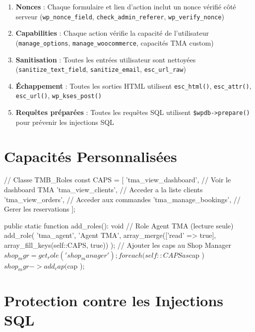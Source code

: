 \documentclass[12pt,a4paper]{report}
\begin{document}
\begin{enumerate}
  \item \textbf{Nonces} : Chaque formulaire et lien d'action inclut un nonce v\'erifi\'e
        c\^ot\'e serveur (\texttt{wp\_nonce\_field}, \texttt{check\_admin\_referer},
        \texttt{wp\_verify\_nonce})
  \item \textbf{Capabilities} : Chaque action v\'erifie la capacit\'e de l'utilisateur
        (\texttt{manage\_options}, \texttt{manage\_woocommerce}, capacit\'es TMA custom)
  \item \textbf{Sanitisation} : Toutes les entr\'ees utilisateur sont nettoy\'ees
        (\texttt{sanitize\_text\_field}, \texttt{sanitize\_email}, \texttt{esc\_url\_raw})
  \item \textbf{\'Echappement} : Toutes les sorties HTML utilisent \texttt{esc\_html()},
        \texttt{esc\_attr()}, \texttt{esc\_url()}, \texttt{wp\_kses\_post()}
  \item \textbf{Requ\^etes pr\'epar\'ees} : Toutes les requ\^etes SQL utilisent
        \texttt{\$wpdb->prepare()} pour pr\'evenir les injections SQL
\end{enumerate}

\section{Capacit\'es Personnalis\'ees}

\begin{phpbox}
// Classe TMB_Roles
const CAPS = [
    'tma_view_dashboard',   // Voir le dashboard TMA
    'tma_view_clients',     // Acceder a la liste clients
    'tma_view_orders',      // Acceder aux commandes
    'tma_manage_bookings',  // Gerer les reservations
];

public static function add_roles(): void {
    // Role Agent TMA (lecture seule)
    add_role( 'tma_agent', 'Agent TMA',
        array_merge(['read' => true],
            array_fill_keys(self::CAPS, true)) );
    // Ajouter les caps au Shop Manager
    $shop_mgr = get_role('shop_manager');
    foreach ( self::CAPS as $cap ) {
        $shop_mgr->add_cap( $cap );
    }
}
\end{phpbox}

\section{Protection contre les Injections SQL}

\end{document}
